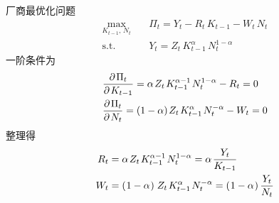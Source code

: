厂商最优化问题
\begin{align*}
    \max_{K_{t-1},\,N_t}\quad & \Pi_t=Y_t-R_t\,K_{t-1}-W_t\,N_t\\
    \text{s.t.}\quad & Y_t=Z_t\,K_{t-1}^\alpha\,N_t^{1-\alpha}
\end{align*}
一阶条件为
\begin{align*}
    &\frac{\p\Pi_t}{\p K_{t-1}}=\alpha\,Z_t\,K_{t-1}^{\alpha-1}\,N_t^{1-\alpha}-R_t=0\\
    &\frac{\p\Pi_t}{\p N_t}=(1-\alpha)\,Z_t\,K_{t-1}^\alpha\,N_t^{-\alpha}-W_t=0
\end{align*}
整理得
\begin{align*}
    R_t&=\alpha\,Z_t\,K_{t-1}^{\alpha-1}\,N_t^{1-\alpha}=\alpha\,\dfrac{Y_t}{K\lt}\\
    W_t&=\bka{1-\alpha}\,Z_t\,K_{t-1}^\alpha\,N_t^{-\alpha}=\bka{1-\alpha}\dfrac{Y_t}{N_t}
\end{align*}


